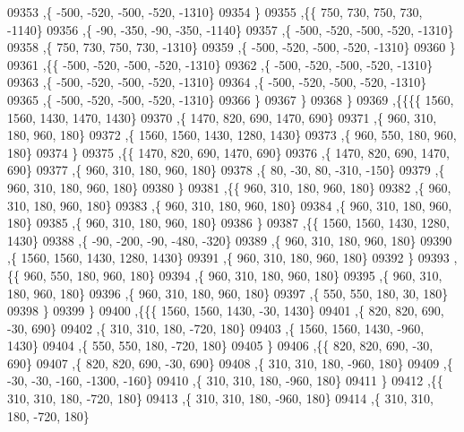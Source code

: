 \begin{DoxyCode}
09353     ,\{  -500,  -520,  -500,  -520, -1310\}
09354     \}
09355    ,\{\{   750,   730,   750,   730, -1140\}
09356     ,\{   -90,  -350,   -90,  -350, -1140\}
09357     ,\{  -500,  -520,  -500,  -520, -1310\}
09358     ,\{   750,   730,   750,   730, -1310\}
09359     ,\{  -500,  -520,  -500,  -520, -1310\}
09360     \}
09361    ,\{\{  -500,  -520,  -500,  -520, -1310\}
09362     ,\{  -500,  -520,  -500,  -520, -1310\}
09363     ,\{  -500,  -520,  -500,  -520, -1310\}
09364     ,\{  -500,  -520,  -500,  -520, -1310\}
09365     ,\{  -500,  -520,  -500,  -520, -1310\}
09366     \}
09367    \}
09368   \}
09369  ,\{\{\{\{  1560,  1560,  1430,  1470,  1430\}
09370     ,\{  1470,   820,   690,  1470,   690\}
09371     ,\{   960,   310,   180,   960,   180\}
09372     ,\{  1560,  1560,  1430,  1280,  1430\}
09373     ,\{   960,   550,   180,   960,   180\}
09374     \}
09375    ,\{\{  1470,   820,   690,  1470,   690\}
09376     ,\{  1470,   820,   690,  1470,   690\}
09377     ,\{   960,   310,   180,   960,   180\}
09378     ,\{    80,   -30,    80,  -310,  -150\}
09379     ,\{   960,   310,   180,   960,   180\}
09380     \}
09381    ,\{\{   960,   310,   180,   960,   180\}
09382     ,\{   960,   310,   180,   960,   180\}
09383     ,\{   960,   310,   180,   960,   180\}
09384     ,\{   960,   310,   180,   960,   180\}
09385     ,\{   960,   310,   180,   960,   180\}
09386     \}
09387    ,\{\{  1560,  1560,  1430,  1280,  1430\}
09388     ,\{   -90,  -200,   -90,  -480,  -320\}
09389     ,\{   960,   310,   180,   960,   180\}
09390     ,\{  1560,  1560,  1430,  1280,  1430\}
09391     ,\{   960,   310,   180,   960,   180\}
09392     \}
09393    ,\{\{   960,   550,   180,   960,   180\}
09394     ,\{   960,   310,   180,   960,   180\}
09395     ,\{   960,   310,   180,   960,   180\}
09396     ,\{   960,   310,   180,   960,   180\}
09397     ,\{   550,   550,   180,    30,   180\}
09398     \}
09399    \}
09400   ,\{\{\{  1560,  1560,  1430,   -30,  1430\}
09401     ,\{   820,   820,   690,   -30,   690\}
09402     ,\{   310,   310,   180,  -720,   180\}
09403     ,\{  1560,  1560,  1430,  -960,  1430\}
09404     ,\{   550,   550,   180,  -720,   180\}
09405     \}
09406    ,\{\{   820,   820,   690,   -30,   690\}
09407     ,\{   820,   820,   690,   -30,   690\}
09408     ,\{   310,   310,   180,  -960,   180\}
09409     ,\{   -30,   -30,  -160, -1300,  -160\}
09410     ,\{   310,   310,   180,  -960,   180\}
09411     \}
09412    ,\{\{   310,   310,   180,  -720,   180\}
09413     ,\{   310,   310,   180,  -960,   180\}
09414     ,\{   310,   310,   180,  -720,   180\}

\end{DoxyCode}
